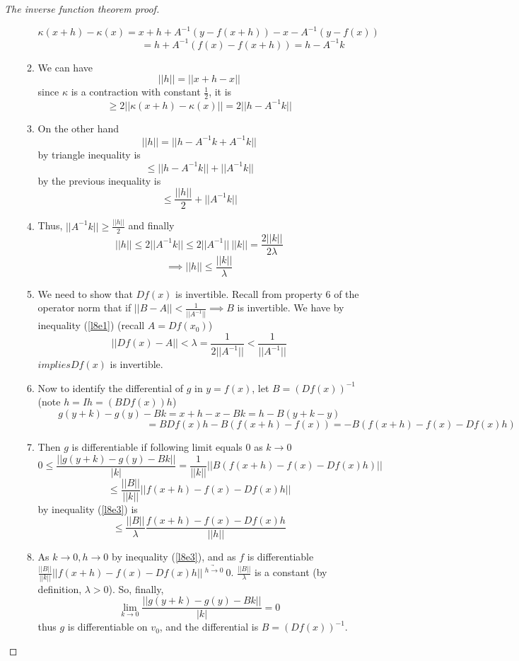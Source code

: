 \begin{proof}[The inverse function theorem proof]
\begin{enumerate}[I]
\begin{enumerate}
      $$\kappa(x+h) - \kappa(x) = x + h + A^{-1}(y-f(x+h))-x-A^{-1}(y-f(x))$$
      $$\phantom{\kappa(x+h) - \kappa(x)} =h+A^{-1}(f(x)-f(x+h))=h-A^{-1}k$$
    \item We can have
      $$||h|| = ||x + h - x||$$
      since $\kappa$ is a contraction with constant $\frac{1}{2}$, it is
      $$\geq 2||\kappa(x+h)-\kappa(x)|| = 2||h-A^{-1}k||$$
    \item On the other hand
      $$||h|| = ||h-A^{-1}k + A^{-1}k||$$
      by triangle inequality is
      $$\leq ||h-A^{-1}k|| + ||A^{-1}k||$$
      by the previous inequality is
      $$\leq \frac{||h||}{2}+||A^{-1}k||$$
    \item Thus, $||A^{-1}k|| \geq \frac{||h||}{2}$ and finally
      $$||h|| \leq 2||A^{-1}k|| \leq 2||A^{-1}||\ ||k|| = \frac{2||k||}{2\lambda}$$
      \begin{equation}
        \label{l8e3}
        \implies ||h|| \leq \frac{||k||}{\lambda}
      \end{equation}
    \item We need to show that $Df(x)$ is invertible. Recall from property 6 of the operator norm that if $||B - A|| < \frac{1}{||A^{-1}||} \implies B$ is invertible. We have by inequality (\ref{l8e1}) (recall $A = Df(x_0)$)
      $$||Df(x) - A|| < \lambda = \frac{1}{2||A^{-1}||} < \frac{1}{||A^{-1}||}$$
      $implies Df(x)$ is invertible.
    \item Now to identify the differential of $g$ in $y=f(x)$, let $B=(Df(x))^{-1}$ (note $h = Ih = (BDf(x))h$)
      $$g(y+k) - g(y) - Bk = x+h-x-Bk = h-B(y+k-y)$$
      $$\phantom{g(y+k) - g(y) - Bk}= BDf(x)h - B(f(x+h) - f(x)) = -B(f(x+h)-f(x)-Df(x)h)$$
    \item Then $g$ is differentiable if following limit equals $0$ as $k \rightarrow 0$
      $$0 \leq \frac{||g(y+k) - g(y) - Bk||}{|k|} = \frac{1}{||k||}||B(f(x+h)-f(x)-Df(x)h)|| $$
      $$\leq \frac{||B||}{||k||}||f(x+h)-f(x)-Df(x)h||$$
      by inequality (\ref{l8e3}) is
      $$\leq \frac{||B||}{\lambda}\frac{f(x+h)-f(x)-Df(x)h}{||h||}$$
    \item As $k\rightarrow 0, h\rightarrow 0$ by inequality (\ref{l8e3}), and as $f$ is differentiable $\frac{||B||}{||k||}||f(x+h)-f(x)-Df(x)h||\ \underrightarrow{^{h\rightarrow 0}}\ 0$. $\frac{||B||}{\lambda}$ is a constant (by definition, $\lambda > 0$).
      So, finally,
      $$\lim_{k\rightarrow 0}\frac{||g(y+k) - g(y) - Bk||}{|k|} = 0$$
      thus $g$ is differentiable on $v_0$, and the differential is $B = (Df(x))^{-1}$.
    \end{enumerate}
  \end{enumerate}
\end{proof}
